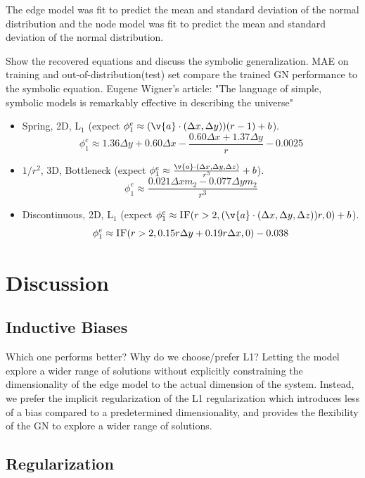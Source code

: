 \documentclass{article}
\begin{document}
The edge model was fit to predict the mean and standard deviation of the normal distribution and the node model was fit to predict the mean and standard deviation of the normal distribution.


Show the recovered equations and discuss the symbolic generalization. MAE on training and out-of-distribution(test) set compare the trained GN performance to the symbolic equation. Eugene Wigner's article: "The language of simple, symbolic models is remarkably effective in describing the universe"


\begin{itemize}
    \item Spring, 2D, L$_1$ (expect $\phi^e_1\approx (\v{a}\cdot (\Delta x, \Delta y)) (r - 1) + b$). 
$$\phi^e_1\approx 1.36 \Delta y + 0.60 \Delta x - \frac{0.60 \Delta x + 1.37 \Delta y}{r} - 0.0025 $$
    \item $1/r^2$, 3D, Bottleneck (expect $\phi^e_1\approx \frac{\v{a}\cdot (\Delta x, \Delta y, \Delta z)}{r^3} + b$). 
$$\phi^e_1\approx \frac{0.021\Delta x m_2 - 0.077 \Delta y m_2}{r^3}$$
    \item Discontinuous, 2D, L$_1$ (expect $\phi^e_1\approx \textsc{IF}(r>2, (\v{a}\cdot (\Delta x, \Delta y, \Delta z)) r, 0) + b$). 
            $$\phi^e_1 \approx \textsc{IF}(r>2,
            0.15 r \Delta y + 0.19 r \Delta x,
            0) - 0.038$$
\end{itemize}

\section{Discussion}

\subsection{Inductive Biases}


Which one performs better? Why do we choose/prefer L1? Letting the model explore a wider range of solutions without explicitly constraining the dimensionality of the edge model to the actual dimension of the system. Instead, we prefer the implicit regularization of the L1 regularization which introduces less of a bias compared to a predetermined dimensionality, and provides the flexibility of the GN to explore a wider range of solutions.


\subsection{Regularization}
\end{document}
